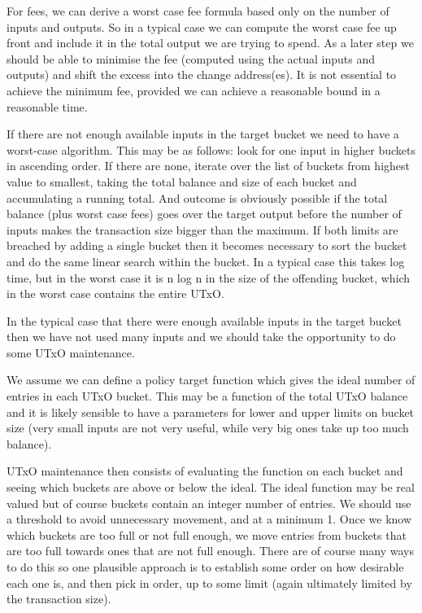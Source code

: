 \documentclass{article}
\theoremstyle{definition}{
  \newtheorem{lemma}{Lemma}[section] %
  \newtheorem{definition}[lemma]{Definition}
}
\theoremstyle{theorem}{
  \newtheorem{invariant}[lemma]{Invariant}
  \newtheorem{proofobligation}[lemma]{Proof Obligation}
}
\numberwithin{equation}{lemma}
\begin{document}
For fees, we can derive a worst case fee formula based only on the number of
inputs and outputs. So in a typical case we can compute the worst case fee up
front and include it in the total output we are trying to spend. As a later
step we should be able to minimise the fee (computed using the actual inputs
and outputs) and shift the excess into the change address(es). It is not
essential to achieve the minimum fee, provided we can achieve a reasonable
bound in a reasonable time.

If there are not enough available inputs in the target bucket we need to have
a worst-case algorithm. This may be as follows: look for one input in higher
buckets in ascending order. If there are none, iterate over the list of buckets
from highest value to smallest, taking the total balance and size of each bucket
and accumulating a running total. And outcome is obviously possible if the total
balance (plus worst case fees) goes over the target output before the number of
inputs makes the transaction size bigger than the maximum. If both limits are
breached by adding a single bucket then it becomes necessary to sort the bucket
and do the same linear search within the bucket. In a typical case this takes
log time, but in the worst case it is n log n in the size of the offending
bucket, which in the worst case contains the entire UTxO.

In the typical case that there were enough available inputs in the target
bucket then we have not used many inputs and we should take the opportunity
to do some UTxO maintenance.

We assume we can define a policy target function which gives the ideal number
of entries in each UTxO bucket. This may be a function of the total UTxO
balance and it is likely sensible to have a parameters for lower and upper
limits on bucket size (very small inputs are not very useful, while very big
ones take up too much balance).

UTxO maintenance then consists of evaluating the function on each bucket and
seeing which buckets are above or below the ideal. The ideal function may be
real valued but of course buckets contain an integer number of entries. We
should use a threshold to avoid unnecessary movement, and at a minimum 1. Once
we know which buckets are too full or not full enough, we move entries from
buckets that are too full towards ones that are not full enough. There are of
course many ways to do this so one plausible approach is to establish some
order on how desirable each one is, and then pick in order, up to some limit
(again ultimately limited by the transaction size).
\end{document}
